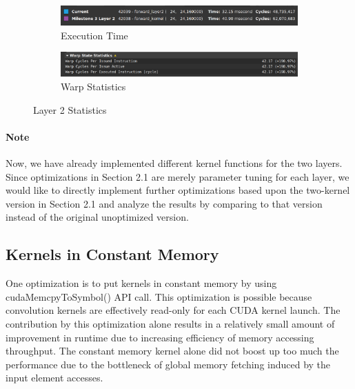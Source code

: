 \documentclass{article}
\begin{document}
\begin{figure}[H]
    \centering
    \begin{subfigure}[b]{\linewidth}
        \includegraphics[width=\linewidth]{2kern_layer2_runtime}
        \caption{Execution Time}
    \end{subfigure}
    \begin{subfigure}[b]{\linewidth}
        \includegraphics[width=\linewidth]{2kern_layer2_warp}
        \caption{Warp Statistics}
    \end{subfigure}
    \caption{Layer 2 Statistics}
\end{figure}

\paragraph{Note}
Now, we have already implemented different kernel functions for the two layers. Since optimizations in Section 2.1
are merely parameter tuning for each layer, we would like to directly implement further optimizations based
upon the two-kernel version in Section 2.1 and analyze the results by comparing to that version instead of
the original unoptimized version.

\subsection{Kernels in Constant Memory}
One optimization is to put kernels in constant memory by using
cudaMemcpyToSymbol() API call. This optimization is possible because convolution
kernels are
effectively read-only for each CUDA kernel launch. The contribution by this
optimization alone results in a relatively small amount of improvement in runtime
due to increasing efficiency of memory accessing throughput. The constant memory
kernel alone did not boost up too much the performance due to the bottleneck
of global memory fetching induced by the input element accesses.
\end{document}
